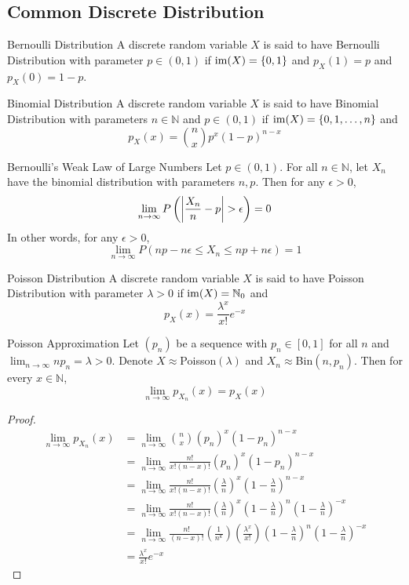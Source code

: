 \documentclass[a4paper]{article}
\begin{document}
\subsection{Common Discrete Distribution}
\begin{defn}{Bernoulli Distribution}{} A discrete random variable $X$ is said to have Bernoulli Distribution with parameter $p\in(0,1)$ if $\operatorname{im}(X)=\{0,1\}$ and $p_X(1)=p$ and $p_X(0)=1-p$. 
\end{defn}

\begin{defn}{Binomial Distribution}{} A discrete random variable $X$ is said to have Binomial Distribution with parameters $n\in\mathbb{N}$ and $p\in(0,1)$ if $\operatorname{im}(X)=\{0,1,\dots,n\}$ and $$p_X(x)=\binom{n}{x}p^x(1-p)^{n-x}$$
\end{defn}

\begin{thm}{Bernoulli's Weak Law of Large Numbers}{} Let $p\in(0,1)$. For all $n\in\mathbb{N}$, let $X_n$ have the binomial distribution with parameters $n,p$. Then for any $\epsilon>0$, $$\lim_{n\to\infty}P\left(\abs{\frac{X_n}{n}-p}>\epsilon\right)=0$$ In other words, for any $\epsilon>0$, $$\lim_{n\to\infty}P(np-n\epsilon\leq X_n\leq np+n\epsilon)=1$$
\end{thm}

\begin{defn}{Poisson Distribution}{} A discrete random variable $X$ is said to have Poisson Distribution with parameter $\lambda>0$ if $\operatorname{im}(X)=\mathbb{N}_0$ and $$p_X(x)=\frac{\lambda^x}{x!}e^{-x}$$
\end{defn}

\begin{thm}{Poisson Approximation}{} Let $(p_n)$ be a sequence with $p_n\in[0,1]$ for all $n$ and $\lim_{n\to\infty}np_n=\lambda>0$. Denote $X\approx$Poisson$(\lambda)$ and $X_n\approx$Bin$(n,p_n)$. Then for every $x\in\mathbb{N}$, $$\lim_{n\to\infty}p_{X_n}(x)=p_X(x)$$
\end{thm}
\begin{proof}
\begin{align*}
\lim_{n\to\infty}p_{X_n}(x)&=\lim_{n\to\infty}\binom{n}{x}(p_n)^x(1-p_n)^{n-x}\\
&=\lim_{n\to\infty}\frac{n!}{x!(n-x)!}(p_n)^x(1-p_n)^{n-x}\\
&=\lim_{n\to\infty}\frac{n!}{x!(n-x)!}\left(\frac{\lambda}{n}\right)^x\left(1-\frac{\lambda}{n}\right)^{n-x}\\
&=\lim_{n\to\infty}\frac{n!}{x!(n-x)!}\left(\frac{\lambda}{n}\right)^x\left(1-\frac{\lambda}{n}\right)^n\left(1-\frac{\lambda}{n}\right)^{-x}\\
&=\lim_{n\to\infty}\frac{n!}{(n-x)!}\left(\frac{1}{n^k}\right)\left(\frac{\lambda^x}{x!}\right)\left(1-\frac{\lambda}{n}\right)^n\left(1-\frac{\lambda}{n}\right)^{-x}\\
&=\frac{\lambda^x}{x!}e^{-x}
\end{align*}
\end{proof}
\end{document}
